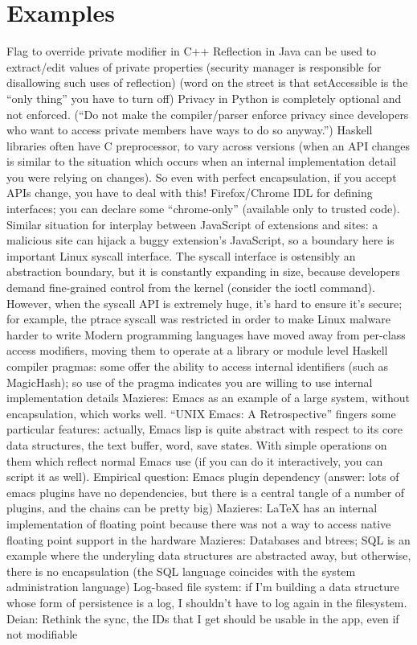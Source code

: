 \section{Examples}\label{sec:examples}

	Flag to override private modifier in C++
	Reflection in Java can be used to extract/edit values of private properties (security manager is responsible for disallowing such uses of reflection) (word on the street is that setAccessible is the ``only thing'' you have to turn off)
	Privacy in Python is completely optional and not enforced. (``Do not make the compiler/parser enforce privacy since developers who want to access private members have ways to do so anyway.'')
	Haskell libraries often have C preprocessor, to vary across versions (when an API changes is similar to the situation which occurs when an internal implementation detail you were relying on changes). So even with perfect encapsulation, if you accept APIs change, you have to deal with this!
	Firefox/Chrome IDL for defining interfaces; you can declare some “chrome-only” (available only to trusted code). Similar situation for interplay between JavaScript of extensions and sites: a malicious site can hijack a buggy extension's JavaScript, so a boundary here is important
	Linux syscall interface. The syscall interface is ostensibly an abstraction boundary, but it is constantly expanding in size, because developers demand fine-grained control from the kernel (consider the ioctl command). However, when the syscall API is extremely huge, it's hard to ensure it's secure; for example, the ptrace syscall was restricted in order to make Linux malware harder to write
	Modern programming languages have moved away from per-class access modifiers, moving them to operate at a library or module level
	Haskell compiler pragmas: some offer the ability to access internal identifiers (such as MagicHash); so use of the pragma indicates you are willing to use internal implementation details
	Mazieres: Emacs as an example of a large system, without encapsulation, which works well. ``UNIX Emacs: A Retrospective'' fingers some particular features: actually, Emacs lisp is quite abstract with respect to its core data structures, the text buffer, word, save states. With simple operations on them which reflect normal Emacs use (if you can do it interactively, you can script it as well). Empirical question: Emacs plugin dependency (answer: lots of emacs plugins have no dependencies, but there is a central tangle of a number of plugins, and the chains can be pretty big)
	Mazieres: LaTeX has an internal implementation of floating point because there was not a way to access native floating point support in the hardware
	Mazieres: Databases and btrees; SQL is an example where the underyling data structures are abstracted away, but otherwise, there is no encapsulation (the SQL language coincides with the system administration language)
	Log-based file system: if I'm building a data structure whose form of persistence is a log, I shouldn't have to log again in the filesystem.
	Deian: Rethink the sync, the IDs that I get should be usable in the app, even if not modifiable
